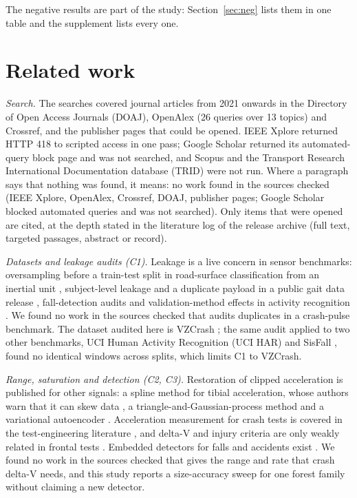 \documentclass{ieeeaccess}
\begin{document}
The negative results are part of the study: Section~\ref{sec:neg} lists them in one table and the supplement lists every one.

\section{Related work}
\label{sec:related}
\emph{Search.} The searches covered journal articles from 2021 onwards in the Directory of Open Access Journals (DOAJ), OpenAlex (26 queries over 13 topics) and Crossref, and the publisher pages that could be opened. IEEE Xplore returned HTTP 418 to scripted access in one pass; Google Scholar returned its automated-query block page and was not searched, and Scopus and the Transport Research International Documentation database (TRID) were not run. Where a paragraph says that nothing was found, it means: no work found in the sources checked (IEEE Xplore, OpenAlex, Crossref, DOAJ, publisher pages; Google Scholar blocked automated queries and was not searched). Only items that were opened are cited, at the depth stated in the literature log of the release archive (full text, targeted passages, abstract or record).

\emph{Datasets and leakage audits (C1).} Leakage is a live concern in sensor benchmarks: oversampling before a train-test split in road-surface classification from an inertial unit \cite{Kumar2026_access}, subject-level leakage and a duplicate payload in a public gait data release \cite{Yang2026_bioeng}, fall-detection audits \cite{Tewari2026_make8100} and validation-method effects in activity recognition \cite{Rehman2024_a1712055}. We found no work in the sources checked that audits duplicates in a crash-pulse benchmark. The dataset audited here is VZCrash \cite{vzcrash}; the same audit applied to two other benchmarks, UCI Human Activity Recognition (UCI HAR) \cite{ucihar} and SisFall \cite{Sucerquia2017_sisfall}, found no identical windows across splits, which limits C1 to VZCrash.

\emph{Range, saturation and detection (C2, C3).} Restoration of clipped acceleration is published for other signals: a spline method for tibial acceleration, whose authors warn that it can skew data \cite{Chan2023_s2310460}, a triangle-and-Gaussian-process method \cite{Jao2022_jsen2021} and a variational autoencoder \cite{Zhang2026_jsen2026}. Acceleration measurement for crash tests is covered in the test-engineering literature \cite{Dima2017_iop}, and delta-V and injury criteria are only weakly related in frontal tests \cite{wusk}. Embedded detectors for falls and accidents exist \cite{SanchezIborra2022_cmc20220}. We found no work in the sources checked that gives the range and rate that crash delta-V needs, and this study reports a size-accuracy sweep for one forest family without claiming a new detector.
\end{document}
